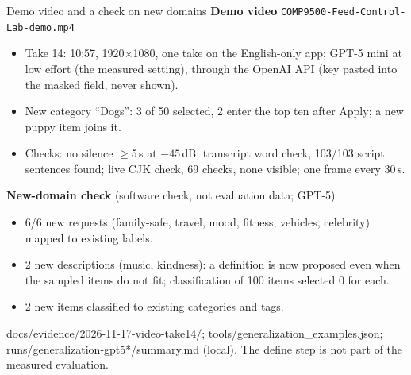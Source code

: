 \documentclass[10pt]{beamer}
\newcommand{\src}[1]{\vfill{\tiny\color{bcitgray}#1}}
\begin{document}
\begin{frame}{Demo video and a check on new domains}
\footnotesize
\textbf{Demo video} \texttt{COMP9500-Feed-Control-Lab-demo.mp4}
\begin{itemize}
\item Take 14: 10:57, 1920$\times$1080, one take on the English-only app; GPT-5 mini at low effort (the measured setting), through the OpenAI API (key pasted into the masked field, never shown).
\item New category ``Dogs'': 3 of 50 selected, 2 enter the top ten after Apply; a new puppy item joins it.
\item Checks: no silence $\geq$5\,s at $-45$\,dB; transcript word check, 103/103 script sentences found; live CJK check, 69 checks, none visible; one frame every 30\,s.
\end{itemize}
\textbf{New-domain check} (software check, not evaluation data; GPT-5)
\begin{itemize}
\item 6/6 new requests (family-safe, travel, mood, fitness, vehicles, celebrity) mapped to existing labels.
\item 2 new descriptions (music, kindness): a definition is now proposed even when the sampled items do not fit; classification of 100 items selected 0 for each.
\item 2 new items classified to existing categories and tags.
\end{itemize}
\src{docs/evidence/2026-11-17-video-take14/; tools/generalization\_examples.json; runs/generalization-gpt5*/summary.md (local). The define step is not part of the measured evaluation.}
\end{frame}
\end{document}
